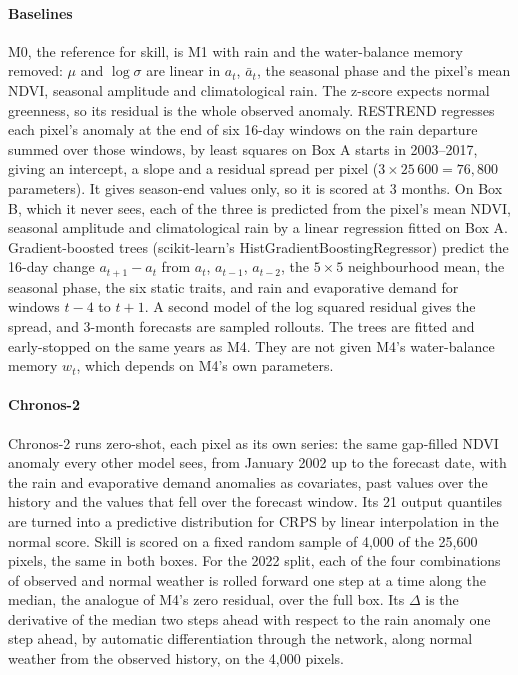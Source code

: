 \documentclass[letterpaper]{article} %
\begin{document}
\paragraph{Baselines} M0, the reference for skill, is M1 with rain and the water-balance memory removed: $\mu$ and $\log\sigma$ are linear in $a_t$, $\bar a_t$, the seasonal phase and the pixel's mean NDVI, seasonal amplitude and climatological rain. The z-score expects normal greenness, so its residual is the whole observed anomaly. RESTREND regresses each pixel's anomaly at the end of six 16-day windows on the rain departure summed over those windows, by least squares on Box A starts in 2003--2017, giving an intercept, a slope and a residual spread per pixel ($3\times25\,600=76{,}800$ parameters). It gives season-end values only, so it is scored at 3 months. On Box B, which it never sees, each of the three is predicted from the pixel's mean NDVI, seasonal amplitude and climatological rain by a linear regression fitted on Box A. Gradient-boosted trees \citep{friedman2001} (scikit-learn's HistGradientBoostingRegressor) predict the 16-day change $a_{t+1}-a_t$ from $a_t$, $a_{t-1}$, $a_{t-2}$, the $5\times5$ neighbourhood mean, the seasonal phase, the six static traits, and rain and evaporative demand for windows $t-4$ to $t+1$. A second model of the log squared residual gives the spread, and 3-month forecasts are sampled rollouts. The trees are fitted and early-stopped on the same years as M4. They are not given M4's water-balance memory $w_t$, which depends on M4's own parameters.

\paragraph{Chronos-2} Chronos-2 \citep{chronos2} runs zero-shot, each pixel as its own series: the same gap-filled NDVI anomaly every other model sees, from January 2002 up to the forecast date, with the rain and evaporative demand anomalies as covariates, past values over the history and the values that fell over the forecast window. Its 21 output quantiles are turned into a predictive distribution for CRPS by linear interpolation in the normal score. Skill is scored on a fixed random sample of 4,000 of the 25,600 pixels, the same in both boxes. For the 2022 split, each of the four combinations of observed and normal weather is rolled forward one step at a time along the median, the analogue of M4's zero residual, over the full box. Its $\Delta$ is the derivative of the median two steps ahead with respect to the rain anomaly one step ahead, by automatic differentiation through the network, along normal weather from the observed history, on the 4,000 pixels.
\end{document}
